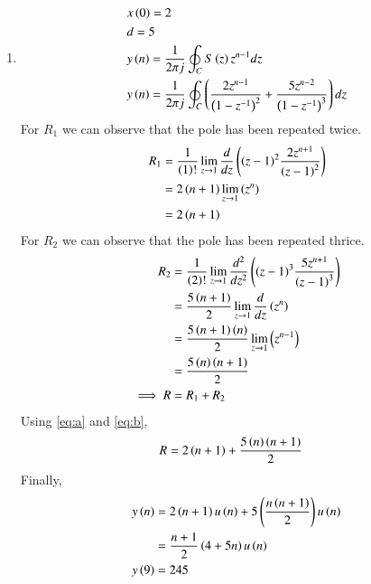\documentclass[journal,12pt,twocolumn]{IEEEtran}
\theoremstyle{remark}
\begin{document}
\begin{enumerate}[label=(\alph*)]
    \item \begin{align}
        &x\left(0\right)=2 \\
        &d=5 \\
        &y\left(n\right)=\frac{1}{2\pi j}\oint_{C}S\left(z\right)z^{n-1}dz  \\
        &y\left(n\right)=\frac{1}{2\pi j}\oint_{C}\left(\dfrac{2z^{n-1}}{\left(1-z^{-1}\right)^2} + \dfrac{5z^{n-2}}{\left(1-z^{-1}\right)^{3}}\right)dz \\
    \end{align}
    For $R_1$ we can observe that the pole has been repeated twice.
\begin{align}
    R_1&=\frac{1}{\left(1\right)!}\lim\limits_{z\to 1}\frac{d}{dz}\left({\left(z-1\right)}^{2}\frac{2z^{n+1}}{{\left(z-1\right)}^2}\right)\\
    &=2\left(n+1\right)\lim\limits_{z\to 1}\left(z^n\right)\\
    &=2\left(n+1\right)\label{eq:a}
\end{align}
    For $R_2$ we can observe that the pole has been repeated thrice.
\begin{align}
    R_2&=\frac{1}{\left(2\right)!}\lim\limits_{z\to 1}\frac{d^{2}}{dz^{2}}\left({\left(z-1\right)}^{3}\frac{5z^{n+1}}{{\left(z-1\right)}^3}\right)\\
    &=\frac{5\left(n+1\right)}{2}\lim\limits_{z\to 1}\frac{d}{dz}\left(z^n\right)\\
    &=\frac{5\left(n+1\right)\left(n\right)}{2}\lim\limits_{z\to 1}\left(z^{n-1}\right)\\
    &=\frac{5\left(n\right)\left(n+1\right)}{2}\label{eq:b} \\
    \implies R&= R_1 + R_2
\end{align}
Using \eqref{eq:a} and \eqref{eq:b},
\begin{align}
   R &=2\left(n+1\right)+\frac{5\left(n\right)\left(n+1\right)}{2}
\end{align}
Finally,
\begin{align}
    y\left(n\right)&=2\left(n+1\right)u\left(n\right)+5\left(\dfrac{{n\left(n+1\right)}}{2}\right)u\left(n\right)\\
    &=\dfrac{n+1}{2}\left(4+5n\right)u\left(n\right) \\
    y\left(9\right)&=245
\end{align}
    \begin{figure}[h!]
        \centering

\end{figure}
\end{enumerate}
\end{document}
